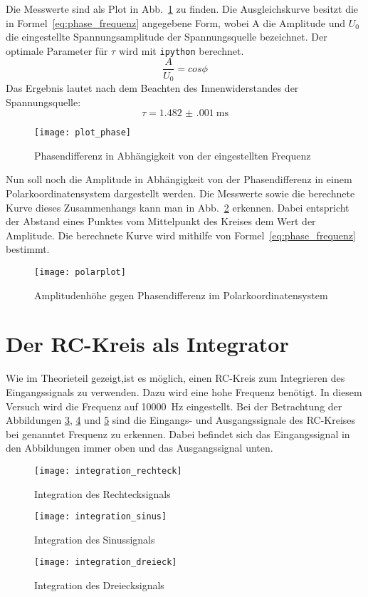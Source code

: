%
Die Messwerte sind als Plot in Abb.~\ref{fig:plot_phase} zu finden. Die
Ausgleichskurve besitzt die in Formel~\eqref{eq:phase_frequenz} angegebene
Form, wobei A die Amplitude und $U_0$ die eingestellte
Spannungsamplitude der Spannungsquelle bezeichnet. Der optimale
Parameter für $\tau$ wird mit \texttt{ipython} berechnet.
%
\begin{equation}
\label{eq:phase_frequenz}
\frac{A}{U_0}=cos{\phi}
\end{equation}
%
Das Ergebnis lautet nach dem Beachten des Innenwiderstandes der
Spannungsquelle:
\begin{equation*}
  \tau = \SI{1.482(001)}{\milli\second}
\end{equation*}
\begin{figure}
  \centering
  \texttt{[image: plot\_phase]}
  \caption{Phasendifferenz in Abhängigkeit von der eingestellten Frequenz}
  \label{fig:plot_phase}
\end{figure}
Nun soll noch die Amplitude in Abhängigkeit von der Phasendifferenz in
einem Polarkoordinatensystem dargestellt werden. Die Messwerte sowie die
berechnete Kurve dieses Zusammenhangs kann man in
Abb.~\ref{fig:polarplot} erkennen. Dabei entspricht der Abstand eines
Punktes vom Mittelpunkt des Kreises dem Wert der Amplitude. Die
berechnete Kurve wird mithilfe von Formel~\eqref{eq:phase_frequenz}
bestimmt.
\begin{figure}
\centering
\texttt{[image: polarplot]}
\caption{Amplitudenhöhe gegen Phasendifferenz im Polarkoordinatensystem}
\label{fig:polarplot}
\end{figure}
\section{Der RC-Kreis als Integrator}
Wie im Theorieteil gezeigt,ist es möglich, einen RC-Kreis zum
Integrieren des Eingangssignals zu verwenden. Dazu wird eine hohe
Frequenz benötigt. In diesem Versuch wird die Frequenz auf
\SI{10000}{\hertz} eingestellt. Bei der Betrachtung der Abbildungen
\ref{fig:integration_rechteck}, \ref{fig:integration_sinus} und
\ref{fig:integration_dreieck} sind die Eingangs- und Ausgangssignale des
RC-Kreises bei genanntet Frequenz zu erkennen. Dabei befindet sich das
Eingangssignal in den Abbildungen immer oben und das Ausgangssignal
unten.

\begin{figure}
  \centering
  \texttt{[image: integration\_rechteck]}
  \caption{Integration des Rechtecksignals}
  \label{fig:integration_rechteck}
\end{figure}

\begin{figure}
  \centering
  \texttt{[image: integration\_sinus]}
  \caption{Integration des Sinussignals}
  \label{fig:integration_sinus}
\end{figure}

\begin{figure}
  \centering
  \texttt{[image: integration\_dreieck]}
  \caption{Integration des Dreiecksignals}
  \label{fig:integration_dreieck}
\end{figure}
